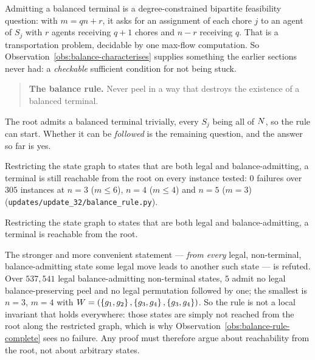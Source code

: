 Admitting a balanced terminal is a degree-constrained bipartite feasibility
question: with $m = qn + r$, it asks for an assignment of each chore $j$ to an
agent of $S_j$ with $r$ agents receiving $q+1$ chores and $n-r$ receiving $q$.
That is a transportation problem, decidable by one max-flow computation. So
Observation~\ref{obs:balance-characterises} supplies something the earlier
sections never had: a \emph{checkable} sufficient condition for not being stuck.

\begin{quote}
\textbf{The balance rule.} Never peel in a way that destroys the existence of a
balanced terminal.
\end{quote}

The root admits a balanced terminal trivially, every $S_j$ being all of
$N$, so the rule can start. Whether it can be \emph{followed} is the
remaining question, and the answer so far is yes.

\begin{observation}
\label{obs:balance-rule-complete}
Restricting the state graph to states that are both legal and balance-admitting,
a terminal is still reachable from the root on every instance tested: $0$
failures over $305$ instances at $n = 3$ ($m \le 6$), $n = 4$ ($m \le 4$) and
$n = 5$ ($m = 3$) (\texttt{updates/update\_32/balance\_rule.py}).
\end{observation}

\begin{conjecture}
\label{conj:balance-rule}
Restricting the state graph to states that are both legal and balance-admitting,
a terminal is reachable from the root.
\end{conjecture}

\begin{remark}
\label{rem:balance-rule-pointwise-false}
The stronger and more convenient statement --- \emph{from every} legal,
non-terminal, balance-admitting state some legal move leads to another such
state --- is refuted. Over $537{,}541$ legal balance-admitting non-terminal
states, $5$ admit no legal balance-preserving peel and no legal permutation
followed by one; the smallest is $n = 3$, $m = 4$ with
$W = (\left\{g_1,g_2\right\}, \left\{g_3,g_4\right\}, \left\{g_3,g_4\right\})$. So the rule is
not a local invariant that holds everywhere: those states are simply not reached
from the root along the restricted graph, which is why
Observation~\ref{obs:balance-rule-complete} sees no failure. Any proof must
therefore argue about reachability from the root, not about arbitrary states.
\end{remark}

